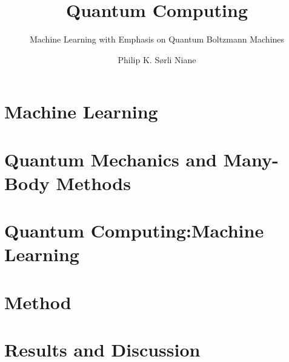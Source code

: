 \documentclass[oneside, a4paper, british]{memoir}
\title{Quantum Computing}
\subtitle{Machine Learning with Emphasis on Quantum Boltzmann Machines}
\author{Philip K. Sørli Niane}
\let\svsection\section
\begin{document}
    \frontmatter        %

    \mnfrontpage
    
    
    
    


    \cleartorecto
    \tableofcontents    %
    
    \renewcommand\section[2][\relax]{%
        \ifx\relax#1%
        \svsection{\titlecap{#2}}%
        \else%
        \svsection[\titlecap{#1}]{\titlecap{#2}}%
        \fi%
    }
    
    \cleartorecto
    \listoffigures      %
    \cleartorecto
    \listoftables       %

    \mainmatter         %

    

    \part{Machine Learning}

    
    \part{Quantum Mechanics and Many-Body Methods}

    
    
    
    \part{Quantum Computing:Machine Learning}
    
    
    \part{Method}
    
    
    \part{Results and Discussion}
    
    
\end{document}
